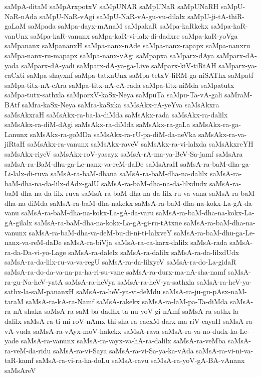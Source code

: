 {saMpA-ditaM
saMpArxpotxV
saMpUNAR
saMpUNaR
saMpUNaRH
saMpU-NaR-nAda
saMpU-NaR-vAgi
saMpU-NaR-vA-gu-vu-dilalx
saMpU-ji-tA-thiR-gaLaM
saMpada
saMpa-dayx-mAnaM
saMpakaR
saMpa-kaRkekx
saMpa-kaR-vanUnx
saMpa-kaR-vanunx
saMpa-kaR-vi-lalx-di-dadxre
saMpa-kaR-yoVga
saMpananx
saMpananxH
saMpa-nanx-nAde
saMpa-nanx-rapapx
saMpa-nanxru
saMpa-nanx-ru-mapapx
saMpa-nanx-vAgi
saMpapxa
saMparx-dAya
saMparx-dA-yada
saMparx-dA-yadi
saMparx-dA-ya-ga-Live
saMparx-kiV-tiRtAH
saMparx-ya-caCxti
saMpa-shayxnf
saMpa-tatxnUnx
saMpa-tetxV-liRM-ga-niSAThx
saMpatf
saMpa-titx-nA-cAra
saMpa-titx-nA-cA-rada
saMpa-titx-niMda
saMpatutx
saMpa-tutx-sathxla
saMporxV-kaSx-Neya
saMpuTa
saMpu-Ta-vA-gali
saMraM-BAtf
saMra-kaSx-Neya
saMra-kaSxka
saMsAkx-rA-yeYva
saMsAkxra
saMsAkxraH
saMsAkx-ra-ba-la-diMda
saMsAkx-rada
saMsAkx-ra-dalilx
saMsAkx-ra-diM-dAgi
saMsAkx-ra-diMda
saMsAkx-ra-gaLa
saMsAkx-ra-ga-Lanunx
saMsAkx-ra-goMDa
saMsAkx-ra-rU-pa-diM-da-neVka
saMsAkx-ra-va-jiRtaH
saMsAkx-ra-vanunx
saMsAkx-raveV
saMsAkx-ra-vi-lalxda
saMsAkxreYH
saMsAkx-riyeV
saMsAkx-roV-yasayx
saMsA-rA-ma-ya-BeV-Sa-jamf
saMsAra
saMsA-ra-BaM-dhu-ga-Le-nanx-va-reM-daDe
saMsAraH
saMsA-ra-baM-dha-ga-Li-lalx-di-ruva
saMsA-ra-baM-dhana
saMsA-ra-baM-dha-na-dalilx
saMsA-ra-baM-dha-na-da-lilx-dAdx-galU
saMsA-ra-baM-dha-na-da-lilxdudx
saMsA-ra-baM-dha-na-da-lilx-ruva
saMsA-ra-baM-dha-na-da-lilx-ru-va-vana
saMsA-ra-baM-dha-na-diMda
saMsA-ra-baM-dha-nakekx
saMsA-ra-baM-dha-na-kokx-La-gA-da-vanu
saMsA-ra-baM-dha-na-kokx-La-gA-da-varu
saMsA-ra-baM-dha-na-kokx-La-gA-gilalx
saMsA-ra-baM-dha-na-kokx-La-gA-gi-ru-tAtxne
saMsA-ra-baM-dha-na-vanunx
saMsA-ra-baM-dha-va-deM-bu-di-ni-ti-lalxveY
saMsA-ra-baM-dhu-ga-Le-nanx-va-reM-daDe
saMsA-ra-biVja
saMsA-ra-ca-karx-dalilx
saMsA-rada
saMsA-ra-da-Da-vi-yo-Lage
saMsA-ra-dalelx
saMsA-ra-dalilx
saMsA-ra-da-lilxdUdx
saMsA-ra-da-lilx-ru-va-va-regU
saMsA-ra-da-lilxyeV
saMsA-ra-do-La-gidaR
saMsA-ra-do-da-va-na-pa-ha-ri-su-vane
saMsA-ra-durx-ma-nA-sha-namf
saMsA-ra-gu-Na-heV-yatA
saMsA-ra-heVya
saMsA-ra-heV-ya-sathxla
saMsA-ra-heV-ya-sathx-la-saM-pananxH
saMsA-ra-heV-ya-vi-deMdu
saMsA-ra-ju-gu-pAsx-naM-taraM
saMsA-ra-kA-ra-Namf
saMsA-rakekx
saMsA-ra-laM-pa-Ta-diMda
saMsA-ra-nA-shaka
saMsA-ra-saM-ba-dadhx-ta-nu-yoV-gi-nAmf
saMsA-ra-sathx-la-dalilx
saMsA-ra-ti-mi-roV-nAmx-thi-sha-ra-cacxM-darx-ma-riV-cayaH
saMsA-ra-vA-vuda
saMsA-ra-vAyx-moV-hakekx
saMsA-rava
saMsA-ra-va-no-dudx-ka-Le-yade
saMsA-ra-vanunx
saMsA-ra-vayx-va-hA-ra-dalilx
saMsA-ra-veMba
saMsA-ra-veM-da-ridu
saMsA-ra-vi-Saya
saMsA-ra-vi-Sa-ya-ka-vAda
saMsA-ra-vi-ni-va-taR-kamf
saMsA-ra-vi-ra-ha-doLu
saMsA-ravu
saMsA-ra-yoV-gA-BA-vAnanx
saMsAreV
}

